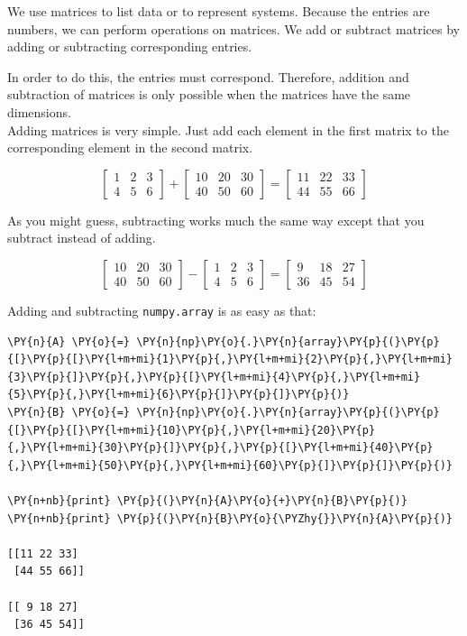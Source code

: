 We use matrices to list data or to represent systems. Because the
entries are numbers, we can perform operations on matrices. We add or
subtract matrices by adding or subtracting corresponding entries.

In order to do this, the entries must correspond. Therefore, addition
and subtraction of matrices is only possible when the matrices have the
same dimensions.\\
Adding matrices is very simple. Just add each element in the first
matrix to the corresponding element in the second matrix.

\[
\begin{bmatrix}
1 & 2 & 3 \\
4 & 5 & 6
\end{bmatrix}
+
\begin{bmatrix}
10 & 20 & 30\\
40 & 50 & 60
\end{bmatrix}
=
\begin{bmatrix}
11 & 22 & 33\\
44 & 55 & 66
\end{bmatrix}
\]

As you might guess, subtracting works much the same way except that you
subtract instead of adding.

\[
\begin{bmatrix}
10 & 20 & 30\\
40 & 50 & 60
\end{bmatrix}
-
\begin{bmatrix}
1 & 2 & 3 \\
4 & 5 & 6
\end{bmatrix}
=
\begin{bmatrix}
9 & 18 & 27\\
36 & 45 & 54
\end{bmatrix}
\]

Adding and subtracting \texttt{numpy.array} is as easy as that:

\begin{tcolorbox}[breakable, size=fbox, boxrule=1pt, pad at break*=1mm,colback=cellbackground, colframe=cellborder]
\begin{Verbatim}[commandchars=\\\{\}]
\PY{n}{A} \PY{o}{=} \PY{n}{np}\PY{o}{.}\PY{n}{array}\PY{p}{(}\PY{p}{[}\PY{p}{[}\PY{l+m+mi}{1}\PY{p}{,}\PY{l+m+mi}{2}\PY{p}{,}\PY{l+m+mi}{3}\PY{p}{]}\PY{p}{,}\PY{p}{[}\PY{l+m+mi}{4}\PY{p}{,}\PY{l+m+mi}{5}\PY{p}{,}\PY{l+m+mi}{6}\PY{p}{]}\PY{p}{]}\PY{p}{)}
\PY{n}{B} \PY{o}{=} \PY{n}{np}\PY{o}{.}\PY{n}{array}\PY{p}{(}\PY{p}{[}\PY{p}{[}\PY{l+m+mi}{10}\PY{p}{,}\PY{l+m+mi}{20}\PY{p}{,}\PY{l+m+mi}{30}\PY{p}{]}\PY{p}{,}\PY{p}{[}\PY{l+m+mi}{40}\PY{p}{,}\PY{l+m+mi}{50}\PY{p}{,}\PY{l+m+mi}{60}\PY{p}{]}\PY{p}{]}\PY{p}{)}

\PY{n+nb}{print} \PY{p}{(}\PY{n}{A}\PY{o}{+}\PY{n}{B}\PY{p}{)}
\PY{n+nb}{print} \PY{p}{(}\PY{n}{B}\PY{o}{\PYZhy{}}\PY{n}{A}\PY{p}{)}

[[11 22 33]
 [44 55 66]]
 
[[ 9 18 27]
 [36 45 54]]
    \end{Verbatim}
\end{tcolorbox}

